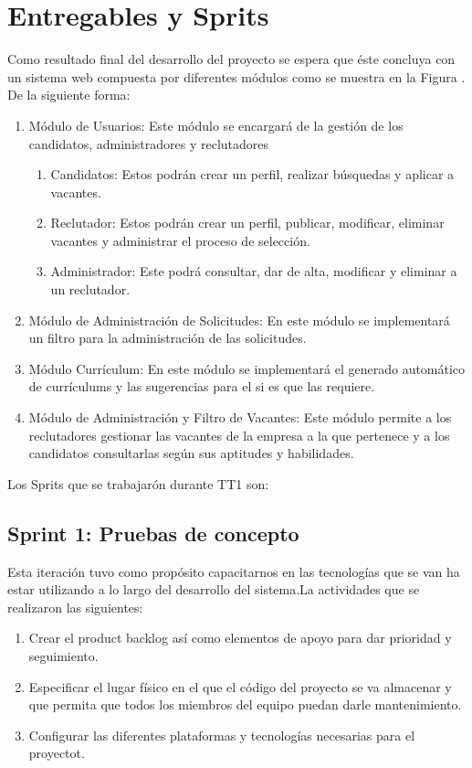 \section{Entregables y Sprits}
Como resultado final del desarrollo del proyecto se espera que éste concluya con un sistema web compuesta por
diferentes módulos como se muestra en la Figura .
De la siguiente forma:
\begin{enumerate}
    \item Módulo de Usuarios: Este módulo se encargará de la gestión de los candidatos, administradores y
    reclutadores
    \begin{enumerate}
        \item Candidatos: Estos podrán crear un perfil, realizar búsquedas y aplicar a vacantes.
        \item Reclutador: Estos podrán crear un perfil, publicar, modificar, eliminar vacantes y administrar el
proceso de selección.
        \item Administrador: Este podrá consultar, dar de alta, modificar y eliminar a un reclutador.
    \end{enumerate}
    \item Módulo de Administración de Solicitudes: En este módulo se implementará un filtro para la administración
de las solicitudes.
\item Módulo Currículum: En este módulo se implementará el generado automático de currículums y las
sugerencias para el si es que las requiere.
\item Módulo de Administración y Filtro de Vacantes: Este módulo permite a los reclutadores gestionar las
vacantes de la empresa a la que pertenece y a los candidatos consultarlas según sus aptitudes y habilidades.
\end{enumerate}
Los Sprits que se trabajarón durante TT1 son:
\subsection{Sprint 1: Pruebas de concepto}
Esta iteración tuvo como propósito capacitarnos en las tecnologías que se van ha estar utilizando 
a lo largo del desarrollo del sistema.La actividades que se realizaron las siguientes:

\begin{enumerate}
    \item Crear el product backlog así como elementos de apoyo para dar prioridad y seguimiento.
    \item Especificar el lugar físico en el que el código del proyecto se va almacenar y que permita que
    todos los miembros del equipo puedan darle mantenimiento.
    \item Configurar las diferentes plataformas y tecnologías necesarias para el proyectot.
\end{enumerate}

